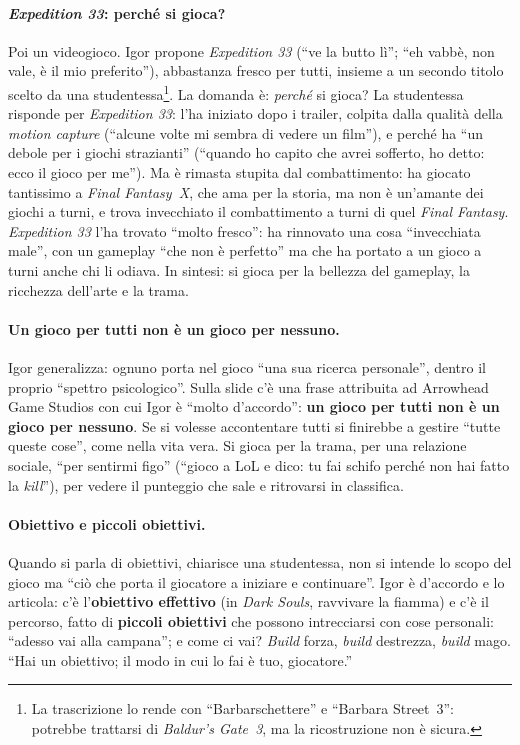 \paragraph{\emph{Expedition 33}: perché si gioca?} Poi un videogioco. Igor propone
\emph{Expedition 33} (``ve la butto lì''; ``eh vabbè, non vale, è il mio preferito''),
abbastanza fresco per tutti, insieme a un secondo titolo scelto da una
studentessa\footnote{La trascrizione lo rende con ``Barbarschettere'' e ``Barbara
Street~3'': potrebbe trattarsi di \emph{Baldur's Gate~3}, ma la ricostruzione non è
sicura.}. La domanda è: \emph{perché} si gioca? La studentessa risponde per
\emph{Expedition 33}: l'ha iniziato dopo i trailer, colpita dalla qualità della
\emph{motion capture} (``alcune volte mi sembra di vedere un film''), e perché ha ``un
debole per i giochi strazianti'' (``quando ho capito che avrei sofferto, ho detto: ecco
il gioco per me''). Ma è rimasta stupita dal combattimento: ha giocato tantissimo a
\emph{Final Fantasy~X}, che ama per la storia, ma non è un'amante dei giochi a turni, e
trova invecchiato il combattimento a turni di quel \emph{Final Fantasy}.
\emph{Expedition 33} l'ha trovato ``molto fresco'': ha rinnovato una cosa ``invecchiata
male'', con un gameplay ``che non è perfetto'' ma che ha portato a un gioco a turni
anche chi li odiava. In sintesi: si gioca per la bellezza del gameplay, la ricchezza
dell'arte e la trama.

\paragraph{Un gioco per tutti non è un gioco per nessuno.} Igor generalizza: ognuno porta
nel gioco ``una sua ricerca personale'', dentro il proprio ``spettro psicologico''. Sulla
slide c'è una frase attribuita ad Arrowhead Game Studios con cui Igor è ``molto
d'accordo'': \textbf{un gioco per tutti non è un gioco per nessuno}. Se si volesse
accontentare tutti si finirebbe a gestire ``tutte queste cose'', come nella vita vera.
Si gioca per la trama, per una relazione sociale, ``per sentirmi figo'' (``gioco a LoL
e dico: tu fai schifo perché non hai fatto la \emph{kill}''), per vedere il punteggio
che sale e ritrovarsi in classifica.

\paragraph{Obiettivo e piccoli obiettivi.} Quando si parla di obiettivi, chiarisce una
studentessa, non si intende lo scopo del gioco ma ``ciò che porta il giocatore a
iniziare e continuare''. Igor è d'accordo e lo articola: c'è l'\textbf{obiettivo
effettivo} (in \emph{Dark Souls}, ravvivare la fiamma) e c'è il percorso, fatto di
\textbf{piccoli obiettivi} che possono intrecciarsi con cose personali: ``adesso vai
alla campana''; e come ci vai? \emph{Build} forza, \emph{build} destrezza, \emph{build}
mago. ``Hai un obiettivo; il modo in cui lo fai è tuo, giocatore.''

